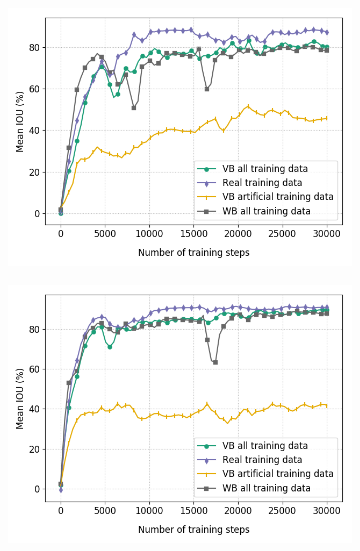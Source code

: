 	\begin{figure}
		\begin{subfigure}{.5\textwidth}
			\centering
			\includegraphics[width=1\linewidth]{images/re_val_xcep_full}
			\caption{}
		\end{subfigure}
		\begin{subfigure}{.5\textwidth}
			\centering
			\includegraphics[width=1\linewidth]{images/re_val_xcep_size}
			\caption{}
		\end{subfigure}
		\begin{subfigure}{.5\textwidth}
			\centering

\end{subfigure}
\end{figure}

